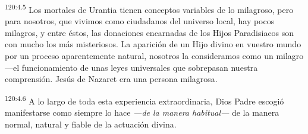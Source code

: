 \par
\textsuperscript{120:4.5} Los mortales de Urantia tienen conceptos variables de lo milagroso, pero para nosotros, que vivimos como ciudadanos del universo local, hay pocos milagros, y entre éstos, las donaciones encarnadas de los Hijos Paradisiacos son con mucho los más misteriosos. La aparición de un Hijo divino en vuestro mundo por un proceso aparentemente natural, nosotros la consideramos como un milagro ---el funcionamiento de unas leyes universales que sobrepasan nuestra comprensión. Jesús de Nazaret era una persona milagrosa.

\par
\textsuperscript{120:4.6} A lo largo de toda esta experiencia extraordinaria, Dios Padre escogió manifestarse como siempre lo hace \textit{{}---de la manera habitual---} de la manera normal, natural y fiable de la actuación divina.